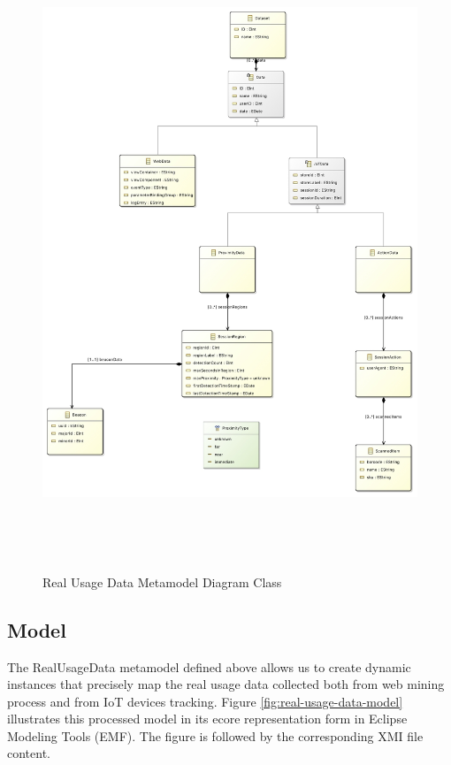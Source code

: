 \vspace{0.5cm}
\begin{figure}[H]
  \centering
    \includegraphics[height=19cm]{images/diagrams/RealUsageDataMetamodel.jpg}
  \caption{Real Usage Data Metamodel Diagram Class}
  \label{fig:real-usage-data-metamodel-diagram}
\end{figure}
\vspace{0.5cm}

\newpage
\subsection{Model}
\label{real-usage-data-model}

The RealUsageData metamodel defined above allows us to create dynamic instances that precisely map the real usage data collected both from web mining process and from IoT devices tracking. Figure \ref{fig:real-usage-data-model} illustrates this processed model in its ecore representation form in Eclipse Modeling Tools (EMF). The figure is followed by the corresponding XMI file content.

